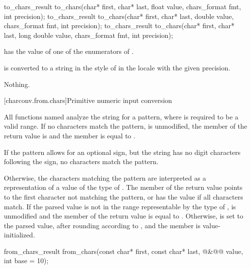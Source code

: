 %
\begin{itemdecl}
to_chars_result to_chars(char* first, char* last, float value,
                         chars_format fmt, int precision);
to_chars_result to_chars(char* first, char* last, double value,
                         chars_format fmt, int precision);
to_chars_result to_chars(char* first, char* last, long double value,
                         chars_format fmt, int precision);
\end{itemdecl}

\begin{itemdescr}
\pnum
\requires {} has the value of
one of the enumerators of .

\pnum
\effects {} is converted to a string
in the style of 
in the  locale
with the given precision.

\pnum
\throws Nothing.
\end{itemdescr}


[charconv.from.chars]{Primitive numeric input conversion}

\pnum
All functions named 
analyze the string 
for a pattern,
where  is required to be a valid range.
If no characters match the pattern,
 is unmodified,
the member  of the return value is  and
the member  is equal to .
\begin{note} If the pattern allows for an optional sign,
but the string has no digit characters following the sign,
no characters match the pattern. \end{note}
Otherwise,
the characters matching the pattern
are interpreted as a representation
of a value of the type of .
The member 
of the return value
points to the first character
not matching the pattern,
or has the value 
if all characters match.
If the parsed value
is not in the range
representable by the type of ,
 is unmodified and
the member  of the return value
is equal to .
Otherwise,
 is set to the parsed value,
after rounding according to , and
the member  is value-initialized.

%
\begin{itemdecl}
from_chars_result from_chars(const char* first, const char* last,
                             @\seebelow@&@\itcorr[-1]@ value, int base = 10);
\end{itemdecl}

